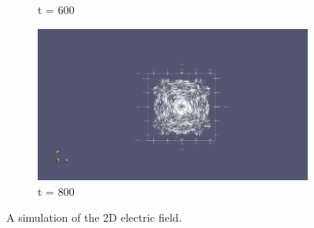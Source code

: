 \begin{figure}
\begin{subfigure}{.49\textwidth}
    	\caption{t = 600}
    \end{subfigure}
    \begin{subfigure}{.49\textwidth}
    	\centering
    	\includegraphics[width=.95\linewidth]{Figures/FDTD2DE4}
    	\caption{t = 800}
    \end{subfigure}
	\decoRule
	\caption[2D Electric Field Simulation]{A simulation of the 2D electric field.}
	\label{fig:FDTD2DE}
\end{figure}

